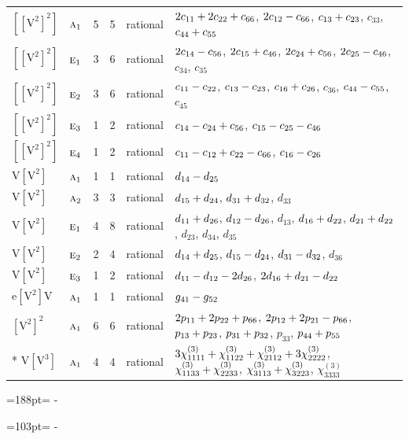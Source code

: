 \documentclass[10pt,a4paper]{article}
\newcommand{\needspace}[1]{\par\penalty-100\begingroup\dimen0=#1\relax\dimen2=\pagegoal
  \advance\dimen2-\pagetotal\ifdim\dimen0>\dimen2\relax\ifdim\dimen2>0pt\vfil\break\fi\fi
  \endgroup}
\numberwithin{equation}{section}
\newcommand{\irr}[1]{\text{\normalfont\scshape #1}}
\newcommand{\jahn}[1]{\mathrm{#1}}
\newlength{\fillwidth}\newlength{\cellwidth}\newlength{\colwidth}
\newcommand{\signbreak}{\penalty100\relax}
\begin{document}
{\begin{longtable}{@{}llrrl>{\RaggedRight\arraybackslash}p{\fillwidth}@{}}
$\jahn{[[V^{2}]^{2}]}$ & $\irr{a}_{1}$ & 5 & 5 & rational & $2c_{11} +\signbreak 2c_{22} +\signbreak c_{66}$, $2c_{12} -\signbreak c_{66}$, $c_{13} +\signbreak c_{23}$, $c_{33}$, $c_{44} +\signbreak c_{55}$\\
$\jahn{[[V^{2}]^{2}]}$ & $\irr{e}_{1}$ & 3 & 6 & rational & $2c_{14} -\signbreak c_{56}$, $2c_{15} +\signbreak c_{46}$, $2c_{24} +\signbreak c_{56}$, $2c_{25} -\signbreak c_{46}$, $c_{34}$, $c_{35}$\\
$\jahn{[[V^{2}]^{2}]}$ & $\irr{e}_{2}$ & 3 & 6 & rational & $c_{11} -\signbreak c_{22}$, $c_{13} -\signbreak c_{23}$, $c_{16} +\signbreak c_{26}$, $c_{36}$, $c_{44} -\signbreak c_{55}$, $c_{45}$\\
$\jahn{[[V^{2}]^{2}]}$ & $\irr{e}_{3}$ & 1 & 2 & rational & $c_{14} -\signbreak c_{24} +\signbreak c_{56}$, $c_{15} -\signbreak c_{25} -\signbreak c_{46}$\\
$\jahn{[[V^{2}]^{2}]}$ & $\irr{e}_{4}$ & 1 & 2 & rational & $c_{11} -\signbreak c_{12} +\signbreak c_{22} -\signbreak c_{66}$, $c_{16} -\signbreak c_{26}$\\
$\jahn{V[V^{2}]}$ & $\irr{a}_{1}$ & 1 & 1 & rational & $d_{14} -\signbreak d_{25}$\\
$\jahn{V[V^{2}]}$ & $\irr{a}_{2}$ & 3 & 3 & rational & $d_{15} +\signbreak d_{24}$, $d_{31} +\signbreak d_{32}$, $d_{33}$\\
$\jahn{V[V^{2}]}$ & $\irr{e}_{1}$ & 4 & 8 & rational & $d_{11} +\signbreak d_{26}$, $d_{12} -\signbreak d_{26}$, $d_{13}$, $d_{16} +\signbreak d_{22}$, $d_{21} +\signbreak d_{22}$, $d_{23}$, $d_{34}$, $d_{35}$\\
$\jahn{V[V^{2}]}$ & $\irr{e}_{2}$ & 2 & 4 & rational & $d_{14} +\signbreak d_{25}$, $d_{15} -\signbreak d_{24}$, $d_{31} -\signbreak d_{32}$, $d_{36}$\\
$\jahn{V[V^{2}]}$ & $\irr{e}_{3}$ & 1 & 2 & rational & $d_{11} -\signbreak d_{12} -\signbreak 2d_{26}$, $2d_{16} +\signbreak d_{21} -\signbreak d_{22}$\\
$\jahn{e[V^{2}]V}$ & $\irr{a}_{1}$ & 1 & 1 & rational & $\mathnormal{g}_{41} -\signbreak \mathnormal{g}_{52}$\\
$\jahn{[V^{2}]^{2}}$ & $\irr{a}_{1}$ & 6 & 6 & rational & $2p_{11} +\signbreak 2p_{22} +\signbreak p_{66}$, $2p_{12} +\signbreak 2p_{21} -\signbreak p_{66}$, $p_{13} +\signbreak p_{23}$, $p_{31} +\signbreak p_{32}$, $p_{33}$, $p_{44} +\signbreak p_{55}$\\*
$\jahn{V[V^{3}]}$ & $\irr{a}_{1}$ & 4 & 4 & rational & $3\chi^{(3)}_{1111} +\signbreak \chi^{(3)}_{1122} +\signbreak \chi^{(3)}_{2112} +\signbreak 3\chi^{(3)}_{2222}$, $\chi^{(3)}_{1133} +\signbreak \chi^{(3)}_{2233}$, $\chi^{(3)}_{3113} +\signbreak \chi^{(3)}_{3223}$, $\chi^{(3)}_{3333}$\\
\bottomrule\end{longtable}}
\needspace{188pt}
\needspace{103pt}
\end{document}
